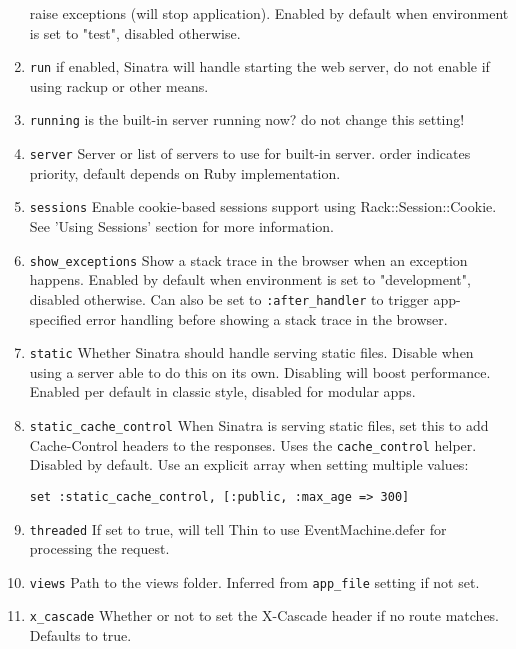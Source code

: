 \begin{enumerate}
raise exceptions (will stop application). Enabled by default when environment is set to "test", disabled otherwise.
\item \verb|run|
if enabled, Sinatra will handle starting the web server, do not enable if using rackup or other means.
\item \verb|running|
is the built-in server running now? do not change this setting!
\item \verb|server|
Server or list of servers to use for built-in server. order indicates priority, default depends on Ruby implementation.
\item \verb|sessions|
Enable cookie-based sessions support using Rack::Session::Cookie. See 'Using Sessions' section for more information.
\item \verb|show_exceptions|
Show a stack trace in the browser when an exception happens. Enabled by default when environment is set to "development", disabled otherwise.
Can also be set to \verb|:after_handler| to trigger app-specified error handling before showing a stack trace in the browser.
\item \verb|static|
Whether Sinatra should handle serving static files.
Disable when using a server able to do this on its own.
Disabling will boost performance.
Enabled per default in classic style, disabled for modular apps.
\item \verb|static_cache_control|
When Sinatra is serving static files, set this to add Cache-Control headers to the responses. 
Uses the \verb|cache_control| helper. Disabled by default.
Use an explicit array when setting multiple values: 
\begin{verbatim}
set :static_cache_control, [:public, :max_age => 300]
\end{verbatim}
\item \verb|threaded|
If set to true, will tell Thin to use EventMachine.defer for processing the request.
\item \verb|views|
Path to the views folder. Inferred from \verb|app_file| setting if not set.
\item \verb|x_cascade|
Whether or not to set the X-Cascade header if no route matches. Defaults to true.
\end{enumerate}

